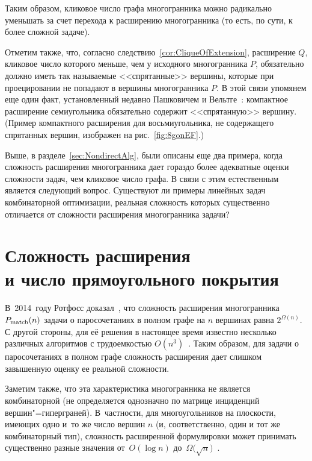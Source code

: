 Таким образом, кликовое число графа многогранника можно радикально уменьшать за счет перехода к расширению многогранника (то есть, по сути, к более сложной задаче).

Отметим также, что, согласно следствию~\ref{cor:CliqueOfExtension}, расширение $Q$, кликовое число которого меньше, чем у исходного многогранника $P$, обязательно должно иметь так называемые <<спрятанные>> вершины, которые при проецировании не попадают в вершины многогранника $P$.
В этой связи упомянем еще один факт, установленный недавно Пашковичем и Вельтге~\cite{Pashkovich:2015hidden}: компактное расширение семиугольника обязательно содержит <<спрятанную>> вершину. (Пример компактного расширения для восьмиугольника, не содержащего спрятанных вершин, изображен на рис.~\ref{fig:8gonEF}.)

Выше, в разделе~\ref{sec:NondirectAlg}, были описаны еще два примера, когда сложность расширения многогранника дает гораздо более адекватные оценки сложности задач, чем кликовое число графа. 
В связи с этим естественным является следующий вопрос.
Существуют ли примеры линейных задач комбинаторной оптимизации, реальная сложность которых существенно отличается от сложности расширения многогранника задачи?


%
%

\section[Сложность расширения и число прямоугольного покрытия]{Сложность расширения\nopagebreak\\ и число прямоугольного покрытия}
\label{sec:ExtensionCounterex}

В~2014~году Ротфосс доказал~\cite{Rothvoss:2014}, что сложность расширения многогранника $P_{\textup{match}}(n)$ задачи о паросочетаниях в полном графе на $n$ вершинах равна $2^{\Omega(n)}$. С другой стороны, для её решения в настоящее время известно несколько различных алгоритмов с трудоемкостью $O(n^3)$~\cite{SchrijverCO:2003}.
Таким образом, для задачи о паросочетаниях в полном графе сложность расширения дает слишком завышенную оценку ее реальной сложности.

Заметим также, что эта характеристика многогранника не является комбинаторной (не определяется однозначно по матрице инциденций вершин"=гиперграней).
В~частности, для многоугольников на плоскости, имеющих одно и~то же число вершин $n$ 
(и, соответственно, один и тот же комбинаторный тип), 
сложность расширенной формулировки может принимать существенно разные значения 
от~$O(\log n)$ до~$\Omega\bigl(\sqrt{n}\bigr)$~\cite{Fiorini:2012polygons}.


